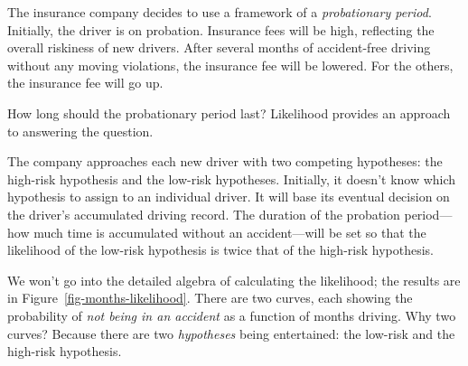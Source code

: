 \documentclass[
  letterpaper,
  DIV=11,
  numbers=noendperiod,
  oneside]{scrartcl}
\begin{document}
The insurance company decides to use a framework of a \emph{probationary
period}. Initially, the driver is on probation. Insurance fees will be
high, reflecting the overall riskiness of new drivers. After several
months of accident-free driving without any moving violations, the
insurance fee will be lowered. For the others, the insurance fee will go
up.

How long should the probationary period last? Likelihood provides an
approach to answering the question.

The company approaches each new driver with two competing hypotheses:
the high-risk hypothesis and the low-risk hypotheses. Initially, it
doesn't know which hypothesis to assign to an individual driver. It will
base its eventual decision on the driver's accumulated driving record.
The duration of the probation period---how much time is accumulated
without an accident---will be set so that the likelihood of the low-risk
hypothesis is twice that of the high-risk hypothesis.
{}

We won't go into the detailed algebra of calculating the likelihood; the
results are in Figure~\ref{fig-months-likelihood}. There are two curves,
each showing the probability of \emph{not being in an accident} as a
function of months driving. Why two curves? Because there are two
\emph{hypotheses} being entertained: the low-risk and the high-risk
hypothesis.
\end{document}
